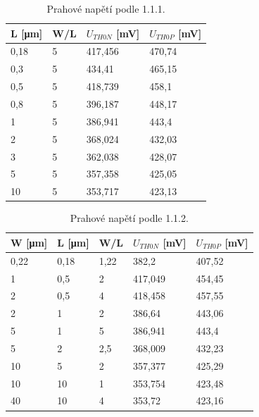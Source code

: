 \begin{table}[]
    \def\arraystretch{1.2}
    \centering
    \begin{tabular}{|l|l|l|l|}
    \hline
    L [\unit{\micro\meter}]    & W/L & \(U_{TH0 N}\) [mV] & \(U_{TH0 P}\) [mV] \\ \hline\hline
    0,18 & 5   & 417,456  & 470,74   \\ \hline
    0,3  & 5   & 434,41   & 465,15   \\ \hline
    0,5  & 5   & 418,739  & 458,1    \\ \hline
    0,8  & 5   & 396,187  & 448,17   \\ \hline
    1    & 5   & 386,941  & 443,4    \\ \hline
    2    & 5   & 368,024  & 432,03   \\ \hline
    3    & 5   & 362,038  & 428,07   \\ \hline
    5    & 5   & 357,358  & 425,05   \\ \hline
    10   & 5   & 353,717  & 423,13   \\ \hline
    \end{tabular}
    \caption{Prahové napětí podle 1.1.1.}
    \label{tab:1-1-1_hodnoty}
\end{table}

\begin{table}[]
    \def\arraystretch{1.2}
    \centering
    \begin{tabular}{|l|l|l|l|l|}
    \hline
    W [\unit{\micro\meter}]    & L [\unit{\micro\meter}]     & W/L  & \(U_{TH0 N}\) [mV] & \(U_{TH0 P}\) [mV] \\ \hline\hline
    0,22  & 0,18 & 1,22& 382,2  & 407,52   \\ \hline
    1    & 0,5  & 2    & 417,049   & 454,45   \\ \hline
    2    & 0,5  & 4    & 418,458  & 457,55    \\ \hline
    2    & 1    & 2    & 386,64  & 443,06   \\ \hline
    5    & 1    & 5    & 386,941  & 443,4    \\ \hline
    5    & 2    & 2,5  & 368,009  & 432,23   \\ \hline
    10   & 5    & 2    & 357,377  & 425,29   \\ \hline
    10   & 10   & 1    & 353,754  & 423,48   \\ \hline
    40   & 10   & 4    & 353,72  & 423,16   \\ \hline
    \end{tabular}
    \caption{Prahové napětí podle 1.1.2.}
    \label{tab:1-1-2_hodnoty}
\end{table}



